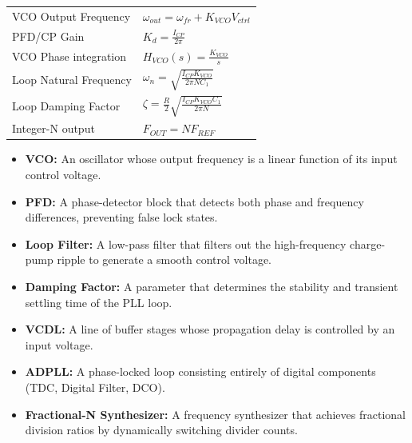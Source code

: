 \documentclass[12pt,a4paper]{article}
\renewcommand{\arraystretch}{1.45}
\begin{document}
\begin{tcolorbox}[formulabox, title={\textbf{Key Formulas at a Glance}}]
\renewcommand{\arraystretch}{1.35}
\begin{tabularx}{\linewidth}{B{5.0cm} X}
VCO Output Frequency & $\omega_{out} = \omega_{fr} + K_{VCO} V_{ctrl}$ \\[4pt]
PFD/CP Gain & $K_d = \frac{I_{CP}}{2\pi}$ \\[4pt]
VCO Phase integration & $H_{VCO}(s) = \frac{K_{VCO}}{s}$ \\[4pt]
Loop Natural Frequency & $\omega_n = \sqrt{\frac{I_{CP} K_{VCO}}{2\pi N C_1}}$ \\[4pt]
Loop Damping Factor & $\zeta = \frac{R}{2} \sqrt{\frac{I_{CP} K_{VCO} C_1}{2\pi N}}$ \\[4pt]
Integer-N output & $F_{OUT} = N F_{REF}$ \\
\end{tabularx}
\end{tcolorbox}

\begin{tcolorbox}[defbox, title={\textbf{One-Line Definitions}}]
\begin{itemize}[leftmargin=*, itemsep=2pt, topsep=0pt]
  \item \textbf{VCO:} An oscillator whose output frequency is a linear function of its input control voltage.
  \item \textbf{PFD:} A phase-detector block that detects both phase and frequency differences, preventing false lock states.
  \item \textbf{Loop Filter:} A low-pass filter that filters out the high-frequency charge-pump ripple to generate a smooth control voltage.
  \item \textbf{Damping Factor:} A parameter that determines the stability and transient settling time of the PLL loop.
  \item \textbf{VCDL:} A line of buffer stages whose propagation delay is controlled by an input voltage.
  \item \textbf{ADPLL:} A phase-locked loop consisting entirely of digital components (TDC, Digital Filter, DCO).
  \item \textbf{Fractional-N Synthesizer:} A frequency synthesizer that achieves fractional division ratios by dynamically switching divider counts.
\end{itemize}
\end{tcolorbox}
\end{document}
